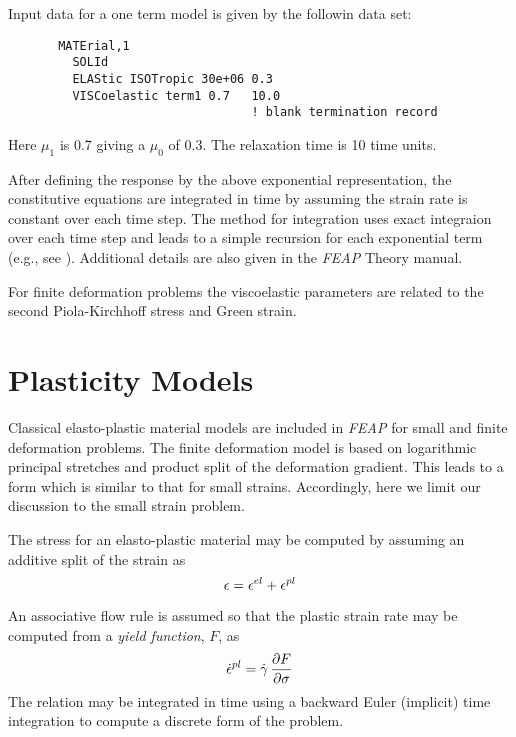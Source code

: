 Input data for a one term model is given by the followin data set:
\begin{verbatim}
       MATErial,1
         SOLId
         ELAStic ISOTropic 30e+06 0.3
         VISCoelastic term1 0.7   10.0
                                  ! blank termination record
\end{verbatim}
Here $\mu_1$ is 0.7 giving a $\mu_0$ of 0.3.  The relaxation time
is 10 time units.

After defining the response by the above exponential representation, the
constitutive equations are integrated in time by assuming the
strain rate is constant over each time step.  The method for integration
uses exact integraion over each time step and leads to a simple recursion
for each exponential term (e.g., see \cite{taylorpg}).  Additional details
are also given in the {\sl FEAP} Theory manual.

For finite deformation problems the viscoelastic parameters are related
to the second Piola-Kirchhoff stress and Green strain.

\section{Plasticity Models}
\label{plasmod}

Classical elasto-plastic material models are included in {\sl FEAP} for
small and finite deformation problems.  The finite deformation model
is based on logarithmic principal stretches and product split of the
deformation gradient.  This leads to a form which is similar to that
for small strains.  Accordingly, here we limit our discussion to the
small strain problem.

The stress for an elasto-plastic material may be computed by assuming
an additive split of the strain as
\begin{equation}
\mathbf{\epsilon} = \mathbf{\epsilon}^{el} + \mathbf{\epsilon}^{pl}
\end{equation}

An associative flow rule is assumed so that the plastic strain rate
may be computed from a {\it yield function}, $F$, as
\begin{equation}
\dot{\mathbf{\epsilon}}^{pl} = \dot{\gamma} \,
\frac{\partial F}{\partial \mathbf{\sigma}}
\end{equation}
The relation may be integrated in time using a backward Euler (implicit)
time integration to compute a discrete form of the problem.

